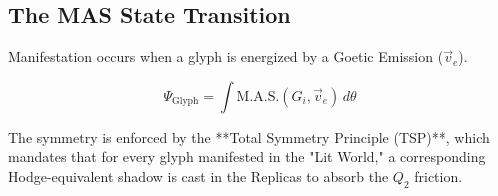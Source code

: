 \documentclass[11pt, a4paper]{article}
\newcommand{\MAS}{\text{M.A.S.}}    %
\begin{document}
\subsection{The MAS State Transition}\label{sec:17.2}
Manifestation occurs when a glyph is energized by a Goetic Emission ($\vec{v}_e$).

\[ \Psi_{\text{Glyph}} = \int \MAS(G_i, \vec{v}_e) \, d\theta \]

The symmetry is enforced by the **Total Symmetry Principle (TSP)**, which mandates that for every glyph manifested in the "Lit World," a corresponding Hodge-equivalent shadow is cast in the Replicas to absorb the $Q_2$ friction.
\end{document}
